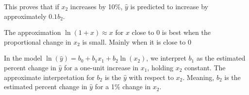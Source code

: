 \documentclass[12pt]{article}
\begin{document}
\begin{enumerate}
This proves that if \( x_2 \) increases by 10\%, \( \hat{y} \) is predicted to increase by approximately \( 0.1b_2 \).



The approximation \( \ln(1 + x) \approx x \) for \( x \) close to 0 is best when the proportional change in \( x_2 \) is small. Mainly when it is close to 0%


In the model \( \ln(\hat{y}) = b_0 + b_1x_1 + b_2\ln(x_2) \), we interpret \( b_1 \) as the estimated percent change in \( \hat{y} \) for a one-unit increase in \( x_1 \), holding \( x_2 \) constant. The approximate interpretation for \( b_2 \) is the \( \hat{y} \) with respect to \( x_2 \). Meaning, \( b_2 \) is the estimated percent change in \( \hat{y} \) for a 1\% change in \( x_2 \).



\end{enumerate}



\end{document}
